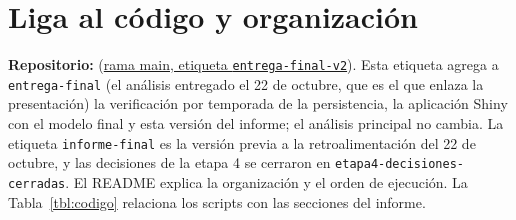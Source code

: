 \section*{Liga al código y organización}
\textbf{Repositorio:} \repo{} (\href{https://github.com/Leo-issacs/reto-sima-multivariados/tree/entrega-final-v2}{rama main, etiqueta \texttt{entrega-final-v2}}). Esta etiqueta agrega a \texttt{entrega-final} (el análisis entregado el 22 de octubre, que es el que enlaza la presentación) la verificación por temporada de la persistencia, la aplicación Shiny con el modelo final y esta versión del informe; el análisis principal no cambia. La etiqueta \texttt{informe-final} es la versión previa a la retroalimentación del 22 de octubre, y las decisiones de la etapa 4 se cerraron en \texttt{etapa4-decisiones-cerradas}. El README explica la organización y el orden de ejecución. La Tabla~\ref{tbl:codigo} relaciona los scripts con las secciones del informe.

